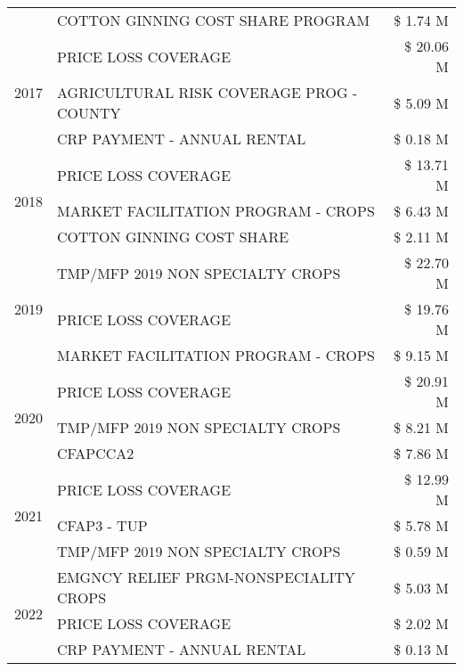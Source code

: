 \begin{tabular}{llr}
 & COTTON GINNING COST SHARE PROGRAM & \$ 1.74 M \\
\cline{1-3}
\multirow[t]{3}{*}{2017} & PRICE LOSS COVERAGE & \$ 20.06 M \\
 & AGRICULTURAL RISK COVERAGE PROG - COUNTY & \$ 5.09 M \\
 & CRP PAYMENT - ANNUAL RENTAL & \$ 0.18 M \\
\cline{1-3}
\multirow[t]{3}{*}{2018} & PRICE LOSS COVERAGE & \$ 13.71 M \\
 & MARKET FACILITATION PROGRAM - CROPS & \$ 6.43 M \\
 & COTTON GINNING COST SHARE & \$ 2.11 M \\
\cline{1-3}
\multirow[t]{3}{*}{2019} & TMP/MFP 2019 NON SPECIALTY CROPS & \$ 22.70 M \\
 & PRICE LOSS COVERAGE & \$ 19.76 M \\
 & MARKET FACILITATION PROGRAM - CROPS & \$ 9.15 M \\
\cline{1-3}
\multirow[t]{3}{*}{2020} & PRICE LOSS COVERAGE & \$ 20.91 M \\
 & TMP/MFP 2019 NON SPECIALTY CROPS & \$ 8.21 M \\
 & CFAPCCA2 & \$ 7.86 M \\
\cline{1-3}
\multirow[t]{3}{*}{2021} & PRICE LOSS COVERAGE & \$ 12.99 M \\
 & CFAP3 - TUP & \$ 5.78 M \\
 & TMP/MFP 2019 NON SPECIALTY CROPS & \$ 0.59 M \\
\cline{1-3}
\multirow[t]{3}{*}{2022} & EMGNCY RELIEF PRGM-NONSPECIALITY CROPS & \$ 5.03 M \\
 & PRICE LOSS COVERAGE & \$ 2.02 M \\
 & CRP PAYMENT - ANNUAL RENTAL & \$ 0.13 M \\
\cline{1-3}
\bottomrule
\end{tabular}
